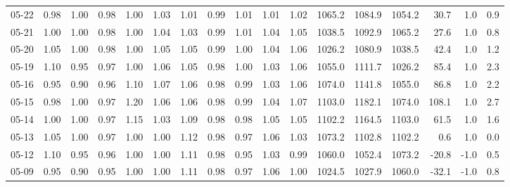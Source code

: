 \begin{threeparttable}
{\begin{tabular}{lrrrrrrrrrrrrrrrr}
  05-22 &   0.98 &   1.00 &         0.98 &     1.00 &           1.03 &        1.01 &        0.99 &        1.01 &          1.01 &          1.02 & 1065.2 & 1084.9 & 1054.2 &       30.7 &                      1.0 &                 0.9 \\
  05-21 &   1.00 &   1.00 &         0.98 &     1.00 &           1.04 &        1.03 &        0.99 &        1.01 &          1.04 &          1.05 & 1038.5 & 1092.9 & 1065.2 &       27.6 &                      1.0 &                 0.8 \\
  05-20 &   1.05 &   1.00 &         0.98 &     1.00 &           1.05 &        1.05 &        0.99 &        1.00 &          1.04 &          1.06 & 1026.2 & 1080.9 & 1038.5 &       42.4 &                      1.0 &                 1.2 \\
  05-19 &   1.10 &   0.95 &         0.97 &     1.00 &           1.06 &        1.05 &        0.98 &        1.00 &          1.03 &          1.06 & 1055.0 & 1111.7 & 1026.2 &       85.4 &                      1.0 &                 2.3 \\
  05-16 &   0.95 &   0.90 &         0.96 &     1.10 &           1.07 &        1.06 &        0.98 &        0.99 &          1.03 &          1.06 & 1074.0 & 1141.8 & 1055.0 &       86.8 &                      1.0 &                 2.2 \\
  05-15 &   0.98 &   1.00 &         0.97 &     1.20 &           1.06 &        1.06 &        0.98 &        0.99 &          1.04 &          1.07 & 1103.0 & 1182.1 & 1074.0 &      108.1 &                      1.0 &                 2.7 \\
  05-14 &   1.00 &   1.00 &         0.97 &     1.15 &           1.03 &        1.09 &        0.98 &        0.98 &          1.05 &          1.05 & 1102.2 & 1164.5 & 1103.0 &       61.5 &                      1.0 &                 1.6 \\
  05-13 &   1.05 &   1.00 &         0.97 &     1.00 &           1.00 &        1.12 &        0.98 &        0.97 &          1.06 &          1.03 & 1073.2 & 1102.8 & 1102.2 &        0.6 &                      1.0 &                 0.0 \\
  05-12 &   1.10 &   0.95 &         0.96 &     1.00 &           1.00 &        1.11 &        0.98 &        0.95 &          1.03 &          0.99 & 1060.0 & 1052.4 & 1073.2 &      -20.8 &                     -1.0 &                 0.5 \\
  05-09 &   0.95 &   0.90 &         0.95 &     1.00 &           1.00 &        1.11 &        0.98 &        0.97 &          1.06 &          1.00 & 1024.5 & 1027.9 & 1060.0 &      -32.1 &                     -1.0 &                 0.8 \\

\end{tabular}}
\end{threeparttable}
